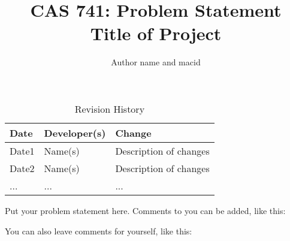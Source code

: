 \documentclass{article}
\title{CAS 741: Problem Statement\\Title of Project}
\author{Author name and macid}
\date{}
\begin{document}
\maketitle

\begin{table}[hp]
\caption{Revision History} \label{TblRevisionHistory}
\begin{tabularx}{\textwidth}{llX}
\toprule
\textbf{Date} & \textbf{Developer(s)} & \textbf{Change}\\
\midrule
Date1 & Name(s) & Description of changes\\
Date2 & Name(s) & Description of changes\\
... & ... & ...\\
\bottomrule
\end{tabularx}
\end{table}

Put your problem statement here.  Comments to you can be added, like this:


You can also leave comments for yourself, like this:

\end{document}
